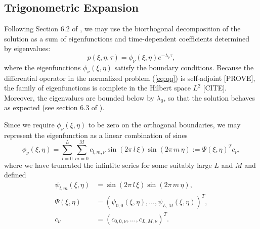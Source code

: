\documentclass[10pt]{article}
\begin{document}
\subsection{Trigonometric Expansion}
Following Section 6.2 of \cite{risken1989fokker-planck}, we may use
the biorthogonal decomposition of the solution as a sum of
eigenfunctions and time-dependent coefficients determined by eigenvalues:
\begin{equation}
  p(\xi,\eta,\tau) = \phi_\nu(\xi,\eta) e^{-\lambda_\nu \tau}, \label{eq:biorthogonal}
\end{equation}
where the eigenfunctions $\phi_\nu(\xi, \eta)$ satisfy the boundary
conditions. Because the differential operator in the normalized
problem (\ref{eq:qq}) is self-adjoint [PROVE], the family of
eigenfunctions is complete in the Hilbert space $L^2$
[CITE]. Moreover, the eigenvalues are bounded below by $\lambda_0$, so
that the solution behaves as expected (see section 6.3 of
\cite{risken1989fokker-planck}).

Since we require $\phi_\nu(\xi,\eta)$ to be zero on the orthogonal
boundaries, we may represent the eigenfunction as a linear combination
of sines
\[
  \phi_\nu(\xi,\eta) = \sum_{l=0}^L \sum_{m=0}^M c_{l,m, \nu}
  \sin\left(2\pi\, l\, \xi \right) \sin\left(2\pi\, m\, \eta \right) := \Psi(\xi,\eta)^T c_\nu,
\]
where we have truncated the infintite series for some suitably large
$L$ and $M$ and defined
\begin{align*}
  \psi_{l,m}(\xi,\eta) &= \sin\left(2\pi\, l\, \xi \right)
                         \sin\left(2\pi\, m\, \eta \right), \\
  \Psi(\xi,\eta) &= (\psi_{0,0}(\xi,\eta), \ldots, \psi_{L,M}(\xi,\eta))^T, \\
  c_\nu &= (c_{0,0,\nu}, \ldots, c_{L,M,\nu})^T.
\end{align*}
\end{document}

